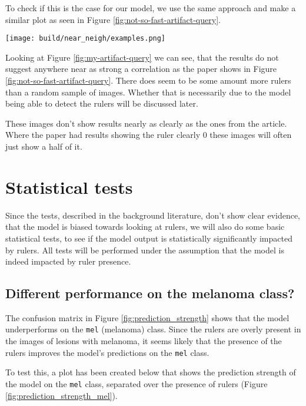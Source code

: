 To check if this is the case for our model, we use the same approach and make a similar plot as seen in Figure \ref{fig:not-so-fast-artifact-query}.

\begin{center}
    \texttt{[image: build/near\_neigh/examples.png]}
    \label{fig:my-artifact-query}
\end{center}

Looking at Figure \ref{fig:my-artifact-query} we can see, that the results do not
suggest anywhere near as strong a correlation as the paper shows in Figure \ref{fig:not-so-fast-artifact-query}.
There does seem to be some amount more rulers than a random sample of images.
Whether that is necessarily due to the model being able to detect the rulers will be discussed later.

These images don't show results nearly as clearly as the ones from the article.
Where the paper had results showing the ruler clearly 0 these images will often just show a half of it.

\section{Statistical tests}\label{sec:statistical-tests}
Since the tests, described in the background literature, don't show clear evidence,
that the model is biased towards looking at rulers, we will also do some basic statistical tests,
to see if the model output is statistically significantly impacted by rulers.
All tests will be performed under the assumption that the model is indeed impacted by ruler presence.

\subsection{Different performance on the melanoma class?}\label{sec:different-performance-on-the-melanoma-class}
The confusion matrix in Figure \ref{fig:prediction_strength} shows that the model underperforms on the \verb|mel| (melanoma) class.
Since the rulers are overly present in the images of lesions with melanoma,
it seems likely that the presence of the rulers improves the model's predictions
on the \verb|mel| class.

To test this, a plot has been created below that shows the prediction strength of the model on the \verb|mel| class,
separated over the presence of rulers (Figure \ref{fig:prediction_strength_mel}).

